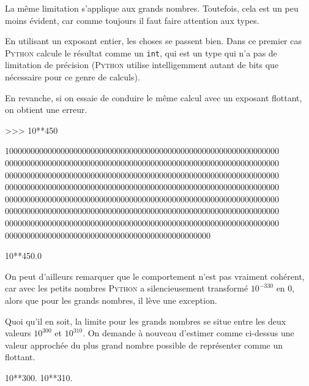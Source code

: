 \vfill
\pagebreak

\begin{exercise}[title=Plus grand flottant, level=basic]
La même limitation s'applique aux grands nombres. Toutefois, cela est un peu moins évident, car comme toujours il faut faire attention aux types.

En utilisant un exposant entier, les choses se passent bien. Dans ce premier cas \textsc{Python} calcule le résultat comme un \texttt{int}, qui est un type qui n'a pas de limitation de précision (\textsc{Python} utilise intelligemment autant de bits que nécessaire pour ce genre de calculs).

En revanche, si on essaie de conduire le même calcul avec un exposant flottant, on obtient une erreur.

\begin{idleconsole}%
	\begin{pyverbatim}
		>>> 10**450
	\end{pyverbatim}
	\vspace{-0.4\baselineskip}
	\textcolor{idleoutputcolor}{1000000000000000000000000000000000000000000000000000000000000000}
	\textcolor{idleoutputcolor}{0000000000000000000000000000000000000000000000000000000000000000}
	\textcolor{idleoutputcolor}{0000000000000000000000000000000000000000000000000000000000000000}
	\textcolor{idleoutputcolor}{0000000000000000000000000000000000000000000000000000000000000000}
	\textcolor{idleoutputcolor}{0000000000000000000000000000000000000000000000000000000000000000}
	\textcolor{idleoutputcolor}{0000000000000000000000000000000000000000000000000000000000000000}
	\textcolor{idleoutputcolor}{0000000000000000000000000000000000000000000000000000000000000000}
	\textcolor{idleoutputcolor}{000000000000000000000000000000000000000000000000}
	\begin{pyconsole}[][breaklines, breakafter=0123456789]
		10**450.0
	\end{pyconsole}
\end{idleconsole}

On peut d'ailleurs remarquer que le comportement n'est pas vraiment cohérent, car avec les petits nombres \textsc{Python} a silencieusement transformé $10^{−330}$ en $0$, alors que pour les grands nombres, il lève une exception.

Quoi qu'il en soit, la limite pour les grands nombres se situe entre les deux valeurs $10^300$ et $10^310$. On demande à nouveau d'estimer comme ci-dessus une valeur approchée du plus grand nombre possible de représenter comme un flottant.

\begin{idleconsole}
	\begin{pyconsole}
		10**300.
		10**310.
	\end{pyconsole}
\end{idleconsole}
\end{exercise}

